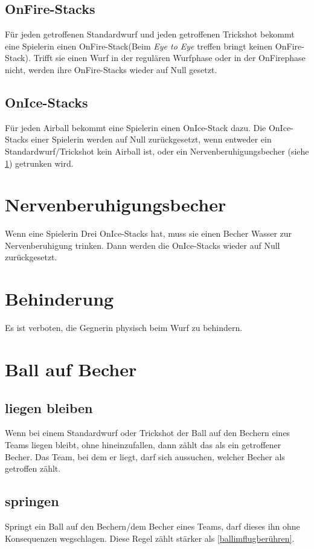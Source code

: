 \documentclass[a5paper, 12pt]{book}
\begin{document}
\subsection{OnFire-Stacks}\label{OnFire-Stacks}
Für jeden getroffenen Standardwurf und jeden getroffenen Trickshot bekommt eine Spielerin einen OnFire-Stack(Beim \textit{ Eye to Eye} treffen bringt keinen OnFire-Stack). Trifft sie einen Wurf in der regulären Wurfphase oder in der OnFirephase nicht, werden ihre OnFire-Stacks wieder auf Null gesetzt.
\subsection{OnIce-Stacks}
Für jeden Airball bekommt eine Spielerin einen OnIce-Stack dazu. Die OnIce-Stacks einer Spielerin werden auf Null zurückgesetzt, wenn entweder ein Standardwurf/Trickshot kein Airball ist, oder ein Nervenberuhigungsbecher (siehe \ref{sec:Nervenberuhigungsbecher}) getrunken wird. 
\section{Nervenberuhigungsbecher}\label{sec:Nervenberuhigungsbecher}
Wenn eine Spielerin Drei OnIce-Stacks hat, muss sie einen Becher Wasser zur Nervenberuhigung trinken. Dann werden die OnIce-Stacks wieder auf Null zurückgesetzt.
\section{Behinderung}\label{Behinderung}
Es ist verboten, die Gegnerin physisch beim Wurf zu behindern. 
\section{Ball auf Becher}\label{sec:aufBecher}
\subsection{liegen bleiben}\label{subsec:liegenBleiben}
Wenn bei einem Standardwurf oder Trickshot der Ball auf den Bechern eines Teams liegen bleibt, ohne hineinzufallen, dann zählt das als ein getroffener Becher. Das Team, bei dem er liegt, darf sich aussuchen, welcher Becher als getroffen zählt.
\subsection{springen}\label{subsec:springen}
Springt ein Ball auf den Bechern/dem Becher eines Teams, darf dieses ihn ohne Konsequenzen wegschlagen. Diese Regel zählt stärker als \ref{ballimflugberühren}.
\appendix
\end{document}
